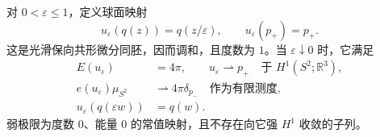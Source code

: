 \begin{example}\label{g3:exm:sphere-mobius-bubble}
	对 \(0<\varepsilon\le1\)，定义球面映射
	\[
		u_\varepsilon(q(z))=q(z/\varepsilon),
		\qquad u_\varepsilon(p_+)=p_+.
	\]
	这是光滑保向共形微分同胚，因而调和，且度数为 \(1\)。当
	\(\varepsilon\downarrow0\) 时，它满足
	\begin{align}
		E(u_\varepsilon)&=4\pi,\qquad
		u_\varepsilon\rightharpoonup p_+
		\quad\text{于 }H^1(S^2;\mathbb R^3),\label{g3:eq:sphere-bubble-weak-limit}\\
		e(u_\varepsilon)\mu_{S^2}
		&\rightharpoonup 4\pi\delta_{p_-}
		\quad\text{作为有限测度},\label{g3:eq:sphere-bubble-energy-measure}\\
		u_\varepsilon(q(\varepsilon w))&=q(w).\label{g3:eq:sphere-bubble-rescaling}
	\end{align}
	弱极限为度数 \(0\)、能量 \(0\) 的常值映射，且不存在向它强 \(H^1\) 收敛的子列。
\end{example}
